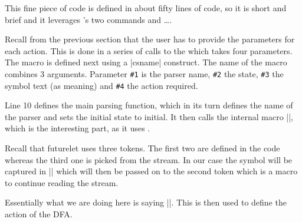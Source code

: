 This fine piece of code is defined in about fifty lines of code, so it is short and brief and it leverages \tex’s two commands \cmd{\futurelet} and \cmd{\csname}\ldots\cmd{\endcsname}.

% 
% 
% 
% 

Recall from the previous section that the user has to provide the parameters for each action. This is done in a series of calls to the \cmd{\pgfparserdef} which takes four parameters. The macro is defined next using a |csname| construct. The name of the macro combines 3 arguments. Parameter \texttt{\#1} is the parser name, \texttt{\#2} the state, \texttt{\#3} the symbol text (as meaning) and \texttt{\#4} the action required. 

\begin{teX}
\def\pgfparserdef#1#2#3#4{%
  \expandafter\def\csname pgf@parser@a@#1@#2@#3\endcsname{#4}
}
\end{teX}



\begin{teXXX}
\def\pgfparserparse#1{%
  \def\pgf@parser{#1}%
  \def\pgf@parser@state{initial}%
  \pgf@parser@parse%
}
\end{teXXX}

Line 10 defines the main parsing function, which in its turn defines the name of the parser and sets the initial state to initial. It then calls the internal macro |\pgf@parser@parse|, which is the interesting part, as it uses \cmd{\futurelet}. 

Recall that futurelet uses three tokens. The first two are defined in the code whereas the third one is picked from the stream. In our case the symbol will be captured in |\pgf@parser@symbol| which will then be passed on to the second token which is a macro to continue reading the stream.

\begin{teXXX}
\def\pgf@parser@parse{%
  \futurelet\pgf@parser@symbol\pgf@parser@cont%
}
\end{teXXX}

Essentially what we are doing here is saying |\let\pgf@parser@symbol=A|. This is then used to define the action
of the DFA.  

